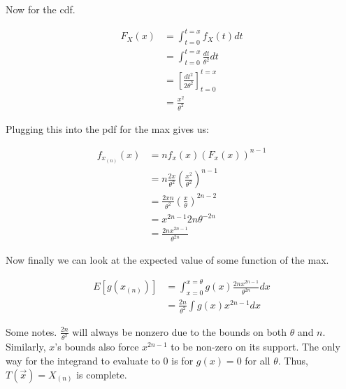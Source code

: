 Now for the cdf.

\begin{align*}
	F_X(x) &= \int_{t=0}^{t=x} f_X(t) dt \\
	&= \int_{t=0}^{t=x} \frac{dt}{\theta^2} dt \\
	&= \left[ \frac{dt^2}{2\theta^2} \right]_{t=0}^{t=x} \\
	&= \frac{x^2}{\theta^2}
\end{align*}

Plugging this into the pdf for the max gives us:

\begin{align*}
	f_{x_{(n)}}(x) &= n f_x(x) (F_x(x))^{n-1} \\
	&= n \frac{2x}{\theta^2} \left( \frac{x^2}{\theta^2} \right)^{n-1} \\
	&= \frac{2xn}{\theta^2} \left( \frac{x}{\theta} \right)^{2n-2} \\
	&= x^{2n-1}2n\theta^{-2n} \\
	&= \frac{2nx^{2n-1}}{\theta^{2n}}
\end{align*}

Now finally we can look at the expected value of some function of the max.

\begin{align*}
	E[g(x_{(n)})] &= \int_{x=0}^{x=\theta} g(x) \frac{2nx^{2n-1}}{\theta^{2n}} dx \\
	&= \frac{2n}{\theta^2} \int g(x) x^{2n-1} dx
\end{align*}

Some notes. $\frac{2n}{\theta^2}$ will always be nonzero due to the bounds on both $\theta$ and $n$. Similarly, $x$'s bounds also force $x^{2n-1}$ to be non-zero on its support. The only way for the integrand to evaluate to 0 is for $g(x) = 0$ for all $\theta$. Thus, $T(\vec{x}) = X_{(n)}$ is complete.
